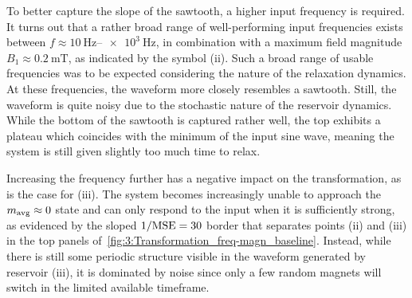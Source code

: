 \vspace{-1em}
\vspace{-1em}

To better capture the slope of the sawtooth, a higher input frequency is required.
It turns out that a rather broad range of well-performing input frequencies exists between $f \approx \SIrange{10}{e3}{\hertz}$, in combination with a maximum field magnitude $B_1 \approx \SI{0.2}{\milli\tesla}$, as indicated by the symbol \textsf{(ii)}.
Such a broad range of usable frequencies was to be expected considering the  nature of the relaxation dynamics.
At these frequencies, the waveform more closely resembles a sawtooth.
Still, the waveform is quite noisy due to the stochastic nature of the reservoir dynamics.
While the bottom of the sawtooth is captured rather well, the top exhibits a plateau which coincides with the minimum of the input sine wave, meaning the system is still given slightly too much time to relax. \par
Increasing the frequency further has a negative impact on the transformation, as is the case for \textsf{(iii)}.
The system becomes increasingly unable to approach the $m_\mathrm{avg} \approx 0$ state and can only respond to the input when it is sufficiently strong, as evidenced by the sloped $1/\mathrm{MSE}=30$ border that separates points \textsf{(ii)} and \textsf{(iii)} in the top panels of~\cref{fig:3:Transformation_freq-magn_baseline}.
Instead, while there is still some periodic structure visible in the waveform generated by reservoir \textsf{(iii)}, it is dominated by noise since only a few random magnets will switch in the limited available timeframe.

